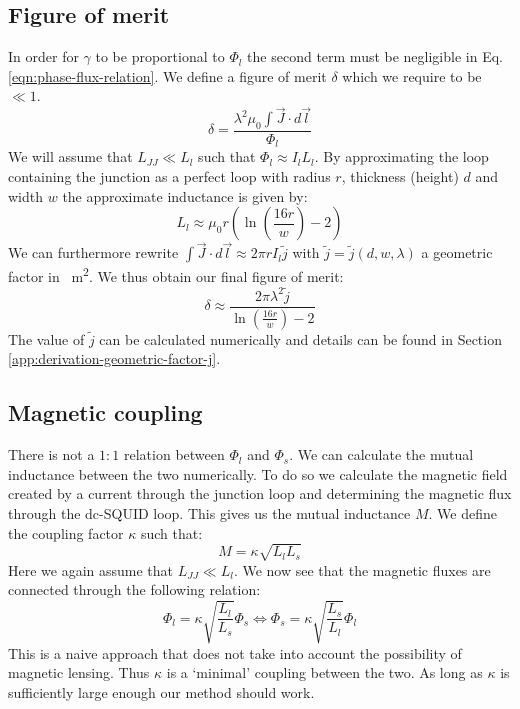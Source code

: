 \subsection{Figure of merit}
\label{sec:figure-of-merit}
In order for $\gamma$ to be proportional to $\Phi_l$ the second term must be negligible in Eq. \ref{eqn:phase-flux-relation}. We define a figure of merit $\delta$ which we require to be $\ll 1$.
\begin{equation}
	\delta = \frac{\lambda^2\mu_0 \int \vec{J}\cdot d \vec{l}}{\Phi_l}
\end{equation}
We will assume that $L_{JJ} \ll L_l$ such that $\Phi_l \approx I_lL_l$. By approximating the loop containing the junction as a perfect loop with radius $r$, thickness (height) $d$ and width $w$ the approximate inductance is given by\cite{eewebCoilInductanceCalculator}:
\begin{equation}
	L_l \approx \mu_0 r \left( \ln\left(\frac{16r}{w}\right) - 2\right)
	\label{eq:loop-inductance}
\end{equation}
We can furthermore rewrite $\int \vec{J} \cdot d \vec{l} \approx 2\pi r I_l \tilde{j}$ with $\tilde{j} = \tilde{j}(d, w, \lambda)$ a geometric factor in \unit{\per\square\meter}. We thus obtain our final figure of merit:
\begin{equation}
	\delta \approx \frac{2\pi \lambda^2 \tilde{j}}{\ln\left(\frac{16r}{w}\right) - 2}
	\label{eqn:figure-of-merit}
\end{equation}
The value of $\tilde{j}$ can be calculated numerically and details can be found in Section \ref{app:derivation-geometric-factor-j}.

\subsection{Magnetic coupling}
\label{sec:magnetic-coupling}
There is not a $1:1$ relation between $\Phi_l$ and $\Phi_s$. We can calculate the mutual inductance between the two numerically. To do so we calculate the magnetic field created by a current through the junction loop and determining the magnetic flux through the dc-SQUID loop. This gives us the mutual inductance $M$. We define the coupling factor $\kappa$ such that:
\begin{equation}
	M = \kappa \sqrt{L_lL_s}
\end{equation}
Here we again assume that $L_{JJ} \ll L_l$. We now see that the magnetic fluxes are connected through the following relation:
\begin{equation}
	\Phi_l = \kappa \sqrt{\frac{L_l}{L_s}}\Phi_s \Leftrightarrow \Phi_s = \kappa \sqrt{\frac{L_s}{L_l}}\Phi_l
\end{equation}
This is a naive approach that does not take into account the possibility of magnetic lensing\cite{prigozhin3DSimulationSuperconducting2018}. Thus $\kappa$ is a `minimal' coupling between the two. As long as $\kappa$ is sufficiently large enough our method should work.

